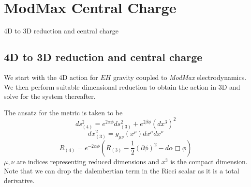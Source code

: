 \section{ModMax Central Charge}

\begin{frame}[allowframebreaks]{4D to 3D reduction and central charge \cite{Dharewa2024}}
\subsection{4D to 3D reduction and central charge}
We start with the 4D action for $EH$ gravity coupled to \textit{ModMax} electrodynamics. We then perform suitable dimensional reduction to obtain the action in 3D and solve for the system thereafter. 

The ansatz for the metric is taken to be 
\begin{equation}
    \label{eqn:4d-3d-metric-ansatz}
    ds_{(4)}^2 = e^{2\alpha\phi}ds_{(3)}^2+e^{2\beta\phi}(dx^3)^2
\end{equation}
\begin{equation}
    dx_{(3)}^2 = g_{\mu\nu}(x^\rho)dx^\mu dx^\nu
\end{equation}
\begin{equation}
    R_{(4)} = e^{-2\alpha\phi} \left ( R_{(3)} - \frac{1}{2} (\partial\phi)^2 - d\alpha \Box\phi \right )
\end{equation}
$\mu, \nu$ are indices representing reduced dimensions and $x^3$ is the compact dimension. Note that we can drop the dalembertian term in the Ricci scalar as it is a total derivative. 


\end{frame}
